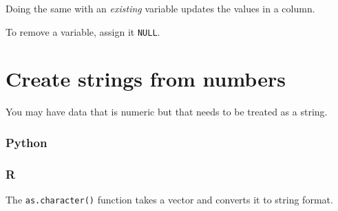 \documentclass[
]{book}
\newenvironment{Shaded}{\begin{snugshade}}{\end{snugshade}}
\newcommand{\CommentTok}[1]{\textcolor[rgb]{0.56,0.35,0.01}{\textit{#1}}}
\newcommand{\ConstantTok}[1]{\textcolor[rgb]{0.00,0.00,0.00}{#1}}
\newcommand{\DecValTok}[1]{\textcolor[rgb]{0.00,0.00,0.81}{#1}}
\newcommand{\ErrorTok}[1]{\textcolor[rgb]{0.64,0.00,0.00}{\textbf{#1}}}
\newcommand{\FunctionTok}[1]{\textcolor[rgb]{0.00,0.00,0.00}{#1}}
\newcommand{\NormalTok}[1]{#1}
\newcommand{\OtherTok}[1]{\textcolor[rgb]{0.56,0.35,0.01}{#1}}
\newcommand{\SpecialCharTok}[1]{\textcolor[rgb]{0.00,0.00,0.00}{#1}}
\newcommand{\StringTok}[1]{\textcolor[rgb]{0.31,0.60,0.02}{#1}}
\begin{document}
Doing the same with an \emph{existing} variable updates the values in a column.

\begin{Shaded}
\end{Shaded}

To remove a variable, assign it \texttt{NULL}.

\begin{Shaded}
\end{Shaded}

\hypertarget{create-strings-from-numbers}{%
\section{Create strings from numbers}\label{create-strings-from-numbers}}

You may have data that is numeric but that needs to be treated as a string.

\hypertarget{python-18}{%
\subsubsection*{Python}\label{python-18}}

\hypertarget{r-18}{%
\subsubsection*{R}\label{r-18}}

The \texttt{as.character()} function takes a vector and converts it to string format.

\begin{Shaded}
\end{Shaded}
\end{document}
